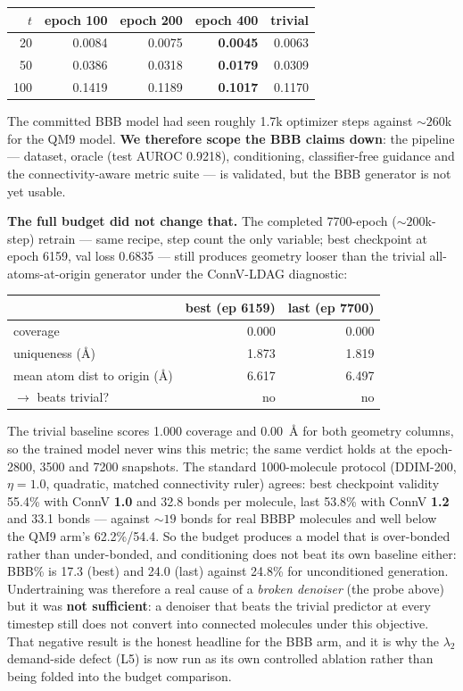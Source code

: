 \documentclass[12pt, a4paper]{article}
\begin{document}
\begin{center}
\begin{tabular}{rrrrr}
\toprule
$t$ & epoch 100 & epoch 200 & epoch 400 & trivial \\
\midrule
20  & 0.0084 & 0.0075 & \textbf{0.0045} & 0.0063 \\
50  & 0.0386 & 0.0318 & \textbf{0.0179} & 0.0309 \\
100 & 0.1419 & 0.1189 & \textbf{0.1017} & 0.1170 \\
\bottomrule
\end{tabular}
\end{center}

The committed BBB model had seen roughly 1.7k optimizer steps against
${\sim}260$k for the QM9 model. \textbf{We therefore scope the BBB claims
down}: the pipeline --- dataset, oracle (test AUROC 0.9218), conditioning,
classifier-free guidance and the connectivity-aware metric suite --- is
validated, but the BBB generator is not yet usable.

\textbf{The full budget did not change that.} The completed 7700-epoch
(${\sim}200$k-step) retrain --- same recipe, step count the only variable;
best checkpoint at epoch 6159, val loss 0.6835 --- still produces geometry
looser than the trivial all-atoms-at-origin generator under the ConnV-LDAG
diagnostic:

\begin{center}
\begin{tabular}{lrr}
\toprule
 & best (ep 6159) & last (ep 7700) \\
\midrule
coverage            & 0.000 & 0.000 \\
uniqueness (\AA)     & 1.873 & 1.819 \\
mean atom dist to origin (\AA) & 6.617 & 6.497 \\
$\rightarrow$ beats trivial? & no & no \\
\bottomrule
\end{tabular}
\end{center}
The trivial baseline scores 1.000 coverage and 0.00~\AA{} for both geometry
columns, so the trained model never wins this metric; the same verdict holds at
the epoch-2800, 3500 and 7200 snapshots. The standard 1000-molecule protocol
(DDIM-200, $\eta=1.0$, quadratic, matched connectivity ruler) agrees: best
checkpoint validity 55.4\% with ConnV \textbf{1.0} and 32.8 bonds per molecule,
last 53.8\% with ConnV \textbf{1.2} and 33.1 bonds --- against ${\sim}19$
bonds for real BBBP molecules and well below the QM9 arm's 62.2\%/54.4. So the
budget produces a model that is over-bonded rather than under-bonded, and
conditioning does not beat its own baseline either: BBB\% is 17.3 (best) and
24.0 (last) against 24.8\% for unconditioned generation. Undertraining was therefore a real
cause of a \emph{broken denoiser} (the probe above) but it was \textbf{not
sufficient}: a denoiser that beats the trivial predictor at every timestep
still does not convert into connected molecules under this objective. That
negative result is the honest headline for the BBB arm, and it is why the
$\lambda_2$ demand-side defect (L5) is now run as its own controlled ablation
rather than being folded into the budget comparison.
\end{document}
